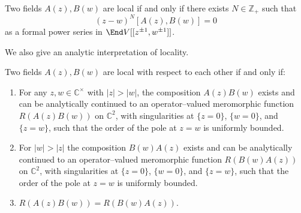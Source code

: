 \documentclass[12pt]{article}
\begin{document}
\begin{proposition}
    Two fields $A(z),B(w)$ are local if and only if there exists
    $N \in \mathbb{Z}_+$ such that
    \begin{equation}\label{eq:locality}
        (z-w)^N [A(z),B(w)] = 0
    \end{equation}
    as a formal power series in $\End V[[z^{\pm1},w^{\pm1}]]$.
\end{proposition}

We also give an analytic interpretation of locality.
\begin{proposition}
    Two fields $A(z),B(w)$ are local with respect to each other
    if and only if:
    \begin{enumerate}
        \item For any $z,w \in \mathbb{C}^\times$ with $|z| > |w|$,
              the composition $A(z)B(w)$ exists and can be analytically
              continued to an operator–valued meromorphic function
              $R(A(z)B(w))$ on $\mathbb{C}^2$, with singularities at
              $\{z=0\}$, $\{w=0\}$, and $\{z=w\}$, such that the order
              of the pole at $z=w$ is uniformly bounded.

        \item For $|w| > |z|$ the composition $B(w)A(z)$ exists and can
              be analytically continued to an operator–valued meromorphic
              function $R(B(w)A(z))$ on $\mathbb{C}^2$, with singularities
              at $\{z=0\}$, $\{w=0\}$, and $\{z=w\}$, such that the order
              of the pole at $z=w$ is uniformly bounded.

        \item $R(A(z)B(w)) = R(B(w)A(z))$.
    \end{enumerate}
\end{proposition}
\end{document}
